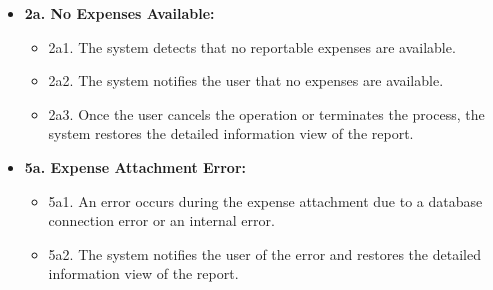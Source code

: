 \begin{itemize} [label={}, leftmargin=0.75cm, noitemsep]

    \item \textbf{2a. No Expenses Available:}
    \begin{itemize} [label={}, leftmargin=0.75cm, noitemsep]
        \item 2a1. The system detects that no reportable expenses are available.
        \item 2a2. The system notifies the user that no expenses are available.
        \item 2a3. Once the user cancels the operation or terminates the process, the system restores the detailed information view of the report.
    \end{itemize}

    \item \textbf{5a. Expense Attachment Error:}
    \begin{itemize} [label={}, leftmargin=0.75cm, noitemsep]
        \item 5a1. An error occurs during the expense attachment due to a database connection error or an internal error.
        \item 5a2. The system notifies the user of the error and restores the detailed information view of the report.
    \end{itemize}

\end{itemize}

\vspace{0.3cm}
